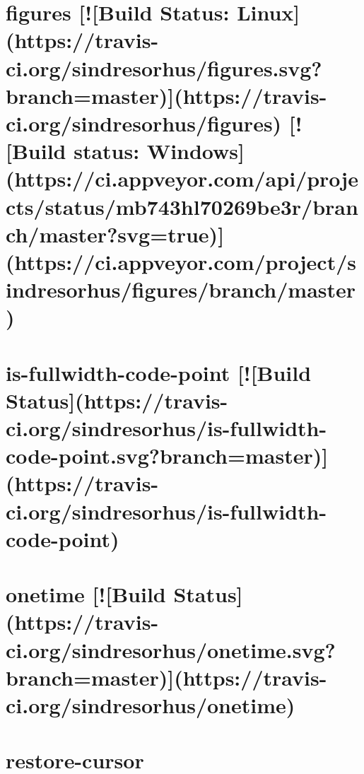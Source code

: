 \documentclass[twoside]{book}
\newcommand{\+}{\discretionary{\mbox{\scriptsize$\hookleftarrow$}}{}{}}
\begin{document}
\chapter{figures \mbox{[}!\mbox{[}Build Status\+: Linux\mbox{]}(https\+://travis-\/ci.org/sindresorhus/figures.svg?branch=master)\mbox{]}(https\+://travis-\/ci.org/sindresorhus/figures) \mbox{[}!\mbox{[}Build status\+: Windows\mbox{]}(https\+://ci.appveyor.\+com/api/projects/status/mb743hl70269be3r/branch/master?svg=true)\mbox{]}(https\+://ci.appveyor.\+com/project/sindresorhus/figures/branch/master)}
\label{md__c_1_workspace_demo_src_main_script_node_modules_inquirer_node_modules_figures_readme}

\chapter{is-\/fullwidth-\/code-\/point \mbox{[}!\mbox{[}Build Status\mbox{]}(https\+://travis-\/ci.org/sindresorhus/is-\/fullwidth-\/code-\/point.svg?branch=master)\mbox{]}(https\+://travis-\/ci.org/sindresorhus/is-\/fullwidth-\/code-\/point)}
\label{md__c_1_workspace_demo_src_main_script_node_modules_inquirer_node_modules_is-fullwidth-code-point_readme}

\chapter{onetime \mbox{[}!\mbox{[}Build Status\mbox{]}(https\+://travis-\/ci.org/sindresorhus/onetime.svg?branch=master)\mbox{]}(https\+://travis-\/ci.org/sindresorhus/onetime)}
\label{md__c_1_workspace_demo_src_main_script_node_modules_inquirer_node_modules_onetime_readme}

\chapter{restore-\/cursor}
\label{md__c_1_workspace_demo_src_main_script_node_modules_inquirer_node_modules_restore-cursor_readme}

\end{document}
